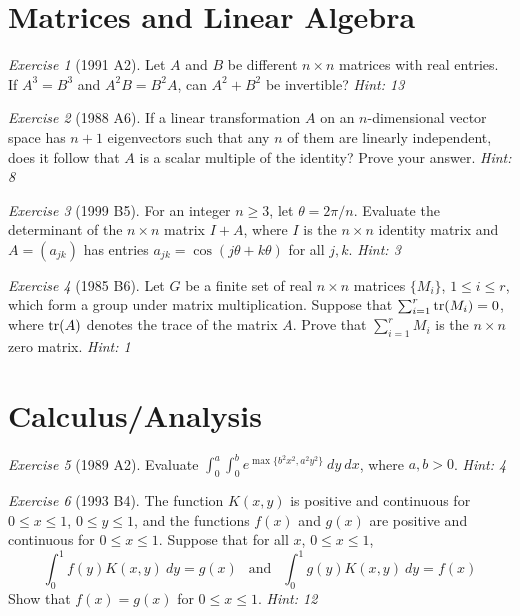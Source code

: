 \documentclass{article}
\theoremstyle{definition}
\theoremstyle{remark}
\newtheorem{exercise}{Exercise}
\begin{document}
\section{Matrices and Linear Algebra}

\begin{exercise}[1991 A2]
Let $A$ and $B$ be different $n\times n$ matrices with real entries. If $A^3 = B^3$ and $A^2B = B^2A$, can $A^2 +B^2$
be invertible? \emph{Hint: 13}
\end{exercise}

\begin{exercise}[1988 A6]
If a linear transformation $A$ on an $n$-dimensional vector space has $n+1$ eigenvectors such that any $n$ of them are linearly independent, does it follow that $A$ is a scalar multiple of the identity? Prove your answer. \emph{Hint: 8} 
\end{exercise}

\begin{exercise}[1999 B5]
For an integer $n\geqslant 3$, let $\theta = 2\pi / n$. Evaluate the determinant of the $n\times n$ matrix $I+A$, where $I$ is the $n\times n$ identity matrix and $A=(a_{jk})$ has entries $a_{jk} = \cos(j\theta+k\theta)$ for all $j,k$. \emph{Hint: 3}
\end{exercise}

\begin{exercise}[1985 B6]
Let $G$ be a finite set of real $n \times n$ matrices $\{M_i\}$, $1 \leqslant i \leqslant r$, which form a group under matrix multiplication. Suppose that $\sum_{i=1}^r \tr (M_i) = 0$, where $\tr (A)$ denotes the trace of the matrix $A$. Prove that $\sum_{i=1}^r M_i$ is the $n \times n$ zero matrix. \emph{Hint: 1}
\end{exercise}

\section{Calculus/Analysis}

\begin{exercise}[1989 A2]
Evaluate $\int_0^a \int_0^b e^{\max\{b^2x^2,a^2y^2\}}\ dy\ dx$, where $a,b>0$. \emph{Hint: 4} 
\end{exercise}

\begin{exercise}[1993 B4]
The function $K(x,y)$ is positive and continuous for $0\leqslant x \leqslant 1$, $0\leqslant y \leqslant 1$, and the functions $f(x)$ and $g(x)$ are positive and continuous for $0\leqslant x \leqslant 1$. Suppose that for all $x$, $0\leqslant x \leqslant 1$,
\[\int_0^1f(y)K(x,y)\ dy = g(x)\ \ \text{ and }\ \ \int_0^1 g(y)K(x,y)\ dy = f(x)\] Show that $f(x)=g(x)$ for $0\leqslant x \leqslant 1$. \emph{Hint: 12}
\end{exercise}
\end{document}
